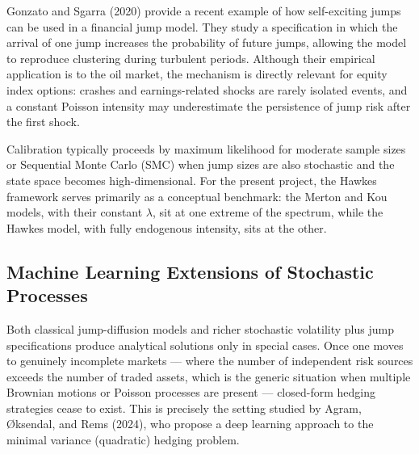 \documentclass[12pt]{article}
\begin{document}
Gonzato and Sgarra (2020) provide a recent example of how self-exciting jumps can be used in a financial jump model. They study a specification in which the arrival of one jump increases the probability of future jumps, allowing the model to reproduce clustering during turbulent periods. Although their empirical application is to the oil market, the mechanism is directly relevant for equity index options: crashes and earnings-related shocks are rarely isolated events, and a constant Poisson intensity may underestimate the persistence of jump risk after the first shock.

Calibration typically proceeds by maximum likelihood for moderate sample sizes or Sequential Monte Carlo (SMC) when jump sizes are also stochastic and the state space becomes high-dimensional. For the present project, the Hawkes framework serves primarily as a conceptual benchmark: the Merton and Kou models, with their constant $\lambda$, sit at one extreme of the spectrum, while the Hawkes model, with fully endogenous intensity, sits at the other.

\subsection*{Machine Learning Extensions of Stochastic Processes}

Both classical jump-diffusion models and richer stochastic volatility plus jump specifications produce analytical solutions only in special cases. Once one moves to genuinely incomplete markets --- where the number of independent risk sources exceeds the number of traded assets, which is the generic situation when multiple Brownian motions or Poisson processes are present --- closed-form hedging strategies cease to exist. This is precisely the setting studied by Agram, \O{}ksendal, and Rems (2024), who propose a deep learning approach to the minimal variance (quadratic) hedging problem.
\end{document}
